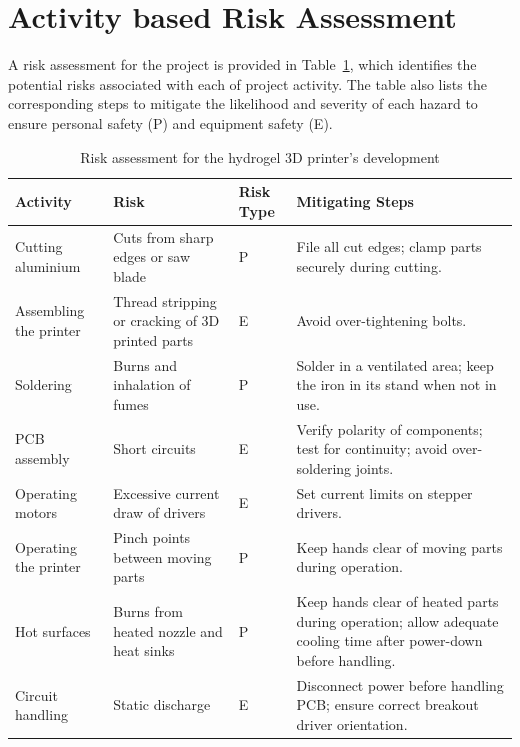\section*{Activity based Risk Assessment}
A risk assessment for the project is provided in Table~\ref{tab:risk}, which identifies the potential risks associated with each of project activity. The table also lists the corresponding steps to mitigate the likelihood and severity of each hazard to ensure personal safety (P) and equipment safety (E).
\begin{table}[H]
\centering
\caption{Risk assessment for the hydrogel 3D printer's development}
\label{tab:risk}
\begin{tabular}{|p{2.4cm}|p{3.3cm}|p{1cm}|p{6.0cm}|}
\hline
\textbf{Activity} & \textbf{Risk} & \textbf{Risk Type} & \textbf{Mitigating Steps} \\ \hline
Cutting aluminium & Cuts from sharp edges or saw blade & P & File all cut edges; clamp parts securely during cutting. \\ \hline
Assembling the printer & Thread stripping or cracking of 3D printed parts & E & Avoid over-tightening bolts. \\ \hline
Soldering & Burns and inhalation of fumes & P & Solder in a ventilated area; keep the iron in its stand when not in use. \\ \hline
PCB assembly & Short circuits & E & Verify polarity of components; test for continuity; avoid over-soldering joints. \\ \hline
Operating motors & Excessive current draw of drivers & E & Set current limits on stepper drivers. \\ \hline
Operating the printer & Pinch points between moving parts & P & Keep hands clear of moving parts during operation. \\ \hline
Hot surfaces & Burns from heated nozzle and heat sinks & P & Keep hands clear of heated parts during operation; allow adequate cooling time after power-down before handling. \\ \hline
Circuit handling & Static discharge & E & Disconnect power before handling PCB; ensure correct breakout driver orientation. \\ \hline
\end{tabular}
\end{table}
